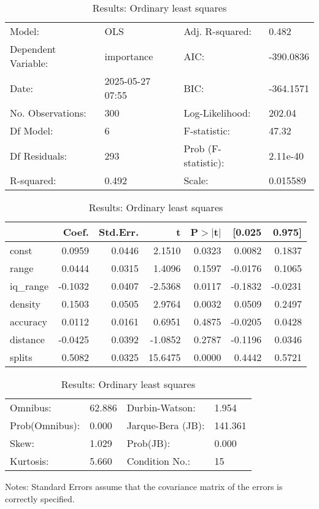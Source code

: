 \begin{table}
\caption{Results: Ordinary least squares}
\label{}
\begin{center}
\begin{tabular}{llll}
\hline
Model:              & OLS              & Adj. R-squared:     & 0.482      \\
Dependent Variable: & importance       & AIC:                & -390.0836  \\
Date:               & 2025-05-27 07:55 & BIC:                & -364.1571  \\
No. Observations:   & 300              & Log-Likelihood:     & 202.04     \\
Df Model:           & 6                & F-statistic:        & 47.32      \\
Df Residuals:       & 293              & Prob (F-statistic): & 2.11e-40   \\
R-squared:          & 0.492            & Scale:              & 0.015589   \\
\hline
\end{tabular}
\end{center}

\begin{center}
\begin{tabular}{lrrrrrr}
\hline
          &   Coef. & Std.Err. &       t & P$> |$t$|$ &  [0.025 &  0.975]  \\
\hline
const     &  0.0959 &   0.0446 &  2.1510 &      0.0323 &  0.0082 &  0.1837  \\
range     &  0.0444 &   0.0315 &  1.4096 &      0.1597 & -0.0176 &  0.1065  \\
iq\_range & -0.1032 &   0.0407 & -2.5368 &      0.0117 & -0.1832 & -0.0231  \\
density   &  0.1503 &   0.0505 &  2.9764 &      0.0032 &  0.0509 &  0.2497  \\
accuracy  &  0.0112 &   0.0161 &  0.6951 &      0.4875 & -0.0205 &  0.0428  \\
distance  & -0.0425 &   0.0392 & -1.0852 &      0.2787 & -0.1196 &  0.0346  \\
splits    &  0.5082 &   0.0325 & 15.6475 &      0.0000 &  0.4442 &  0.5721  \\
\hline
\end{tabular}
\end{center}

\begin{center}
\begin{tabular}{llll}
\hline
Omnibus:       & 62.886 & Durbin-Watson:    & 1.954    \\
Prob(Omnibus): & 0.000  & Jarque-Bera (JB): & 141.361  \\
Skew:          & 1.029  & Prob(JB):         & 0.000    \\
Kurtosis:      & 5.660  & Condition No.:    & 15       \\
\hline
\end{tabular}
\end{center}
\end{table}
\bigskip
Notes: \newline 
[1] Standard Errors assume that the covariance matrix of the errors is correctly specified.